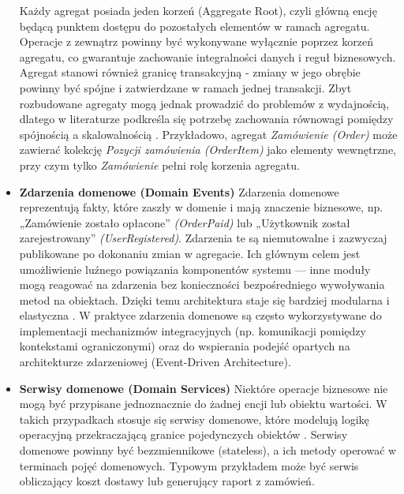 \begin{itemize}
    \newline
    Każdy agregat posiada jeden korzeń (Aggregate Root), czyli główną encję będącą punktem dostępu do pozostałych elementów w ramach agregatu. Operacje z zewnątrz powinny być wykonywane wyłącznie poprzez korzeń agregatu, co gwarantuje zachowanie integralności danych i reguł biznesowych.
    \newline
    Agregat stanowi również granicę transakcyjną - zmiany w jego obrębie powinny być spójne i zatwierdzane w ramach jednej transakcji. Zbyt rozbudowane agregaty mogą jednak prowadzić do problemów z wydajnością, dlatego w literaturze podkreśla się potrzebę zachowania równowagi pomiędzy spójnością a skalowalnością \cite{khononov2021ddd}.
    \newline
    Przykładowo, agregat \textit{Zamówienie (Order)} może zawierać kolekcję \textit{Pozycji zamówienia (OrderItem)} jako elementy wewnętrzne, przy czym tylko \textit{Zamówienie} pełni rolę korzenia agregatu.
    \item \textbf{Zdarzenia domenowe (Domain Events)} \newline
    Zdarzenia domenowe reprezentują fakty, które zaszły w domenie i mają znaczenie biznesowe, np. „Zamówienie zostało opłacone” \textit{(OrderPaid)} lub „Użytkownik został zarejestrowany” \textit{(UserRegistered)}. Zdarzenia te są niemutowalne i zazwyczaj publikowane po dokonaniu zmian w agregacie.
    \newline
    Ich głównym celem jest umożliwienie luźnego powiązania komponentów systemu — inne moduły mogą reagować na zdarzenia bez konieczności bezpośredniego wywoływania metod na obiektach. Dzięki temu architektura staje się bardziej modularna i elastyczna \cite{khononov2021ddd}.
    \newline
    W praktyce zdarzenia domenowe są często wykorzystywane do implementacji mechanizmów integracyjnych (np. komunikacji pomiędzy kontekstami ograniczonymi) oraz do wspierania podejść opartych na architekturze zdarzeniowej (Event-Driven Architecture).
    \item \textbf{Serwisy domenowe (Domain Services)} \newline
    Niektóre operacje biznesowe nie mogą być przypisane jednoznacznie do żadnej encji lub obiektu wartości. W takich przypadkach stosuje się serwisy domenowe, które modelują logikę operacyjną przekraczającą granice pojedynczych obiektów \cite{evans2004ddd}.
    \newline
    Serwisy domenowe powinny być bezzmiennikowe (stateless), a ich metody operować w terminach pojęć domenowych. Typowym przykładem może być serwis obliczający koszt dostawy lub generujący raport z zamówień.

\end{itemize}
